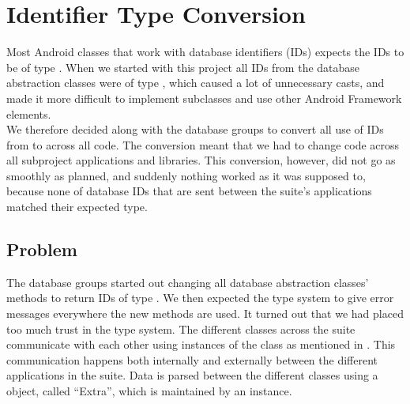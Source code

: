 \section{Identifier Type Conversion} %
\label{sec:identifier_type_conversion}


Most Android classes that work with database identifiers (IDs) expects the IDs to be of type . When we started with this project all IDs from the database abstraction classes were of type , which caused a lot of unnecessary casts, and made it more difficult to implement  subclasses and use other Android Framework elements.\\

We therefore decided along with the database groups to convert all use of IDs from  to  across all code. The conversion meant that we had to change code across all subproject applications and libraries. This conversion, however, did not go as smoothly as planned, and suddenly nothing worked as it was supposed to, because none of database IDs that are sent between the \giraf suite's applications matched their expected type. \\

\subsection{Problem}
The database groups started out changing all database abstraction classes'  methods to return IDs of type . We then expected the type system to give error messages everywhere the new  methods are used. It turned out that we had placed too much trust in the type system. The different  classes across the \giraf suite communicate with each other using instances of the  class as mentioned in . This communication happens both internally and externally between the different applications in the \giraf suite. Data is parsed between the different  classes using a  object, called ``Extra'', which is maintained by an  instance. \\

